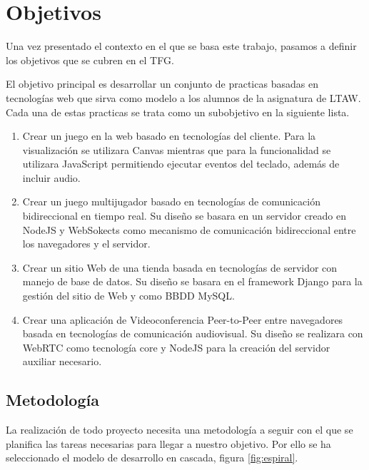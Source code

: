 \chapter{Objetivos} 
Una vez  presentado el contexto en el que se basa este trabajo, pasamos a definir los objetivos que se cubren en el TFG.

El objetivo principal es desarrollar un conjunto de practicas basadas en tecnologías web que sirva como modelo a los alumnos de la asignatura de LTAW. Cada una de estas practicas se trata como un subobjetivo en la siguiente lista.
\begin{enumerate}
\item  Crear un juego en la web basado en tecnologías del cliente. Para la visualización se utilizara Canvas mientras que para la funcionalidad se utilizara JavaScript permitiendo ejecutar eventos del teclado, además de incluir audio.
\item Crear un juego multijugador basado en tecnologías de comunicación bidireccional en tiempo real. Su diseño se basara en un servidor creado en NodeJS y WebSokects como mecanismo de comunicación bidireccional entre los navegadores y el servidor.
\item Crear un sitio Web de una tienda basada en tecnologías de servidor con manejo de base de datos. Su diseño se basara en el framework Django para la gestión del sitio de Web y como BBDD MySQL.
\item Crear una aplicación de Videoconferencia Peer-to-Peer entre navegadores basada en tecnologías de comunicación audiovisual. Su diseño se realizara con WebRTC como tecnología core y NodeJS para la creación del servidor auxiliar necesario.
\end{enumerate}
\section{Metodología}
La realización de todo proyecto necesita una metodología a seguir con el que se planifica las tareas necesarias para llegar a nuestro objetivo. Por ello se ha seleccionado el modelo de desarrollo en cascada, figura \ref{fig:espiral}.


